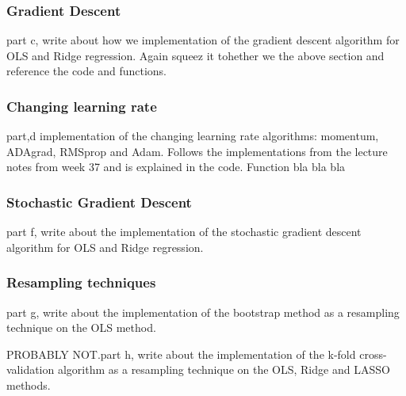 \documentclass[amssymb,twocolumn,aps]{revtex4}
\begin{document}
\subsubsection{Gradient Descent}
part c, write about how we implementation of the gradient descent algorithm for OLS and Ridge regression.
Again squeez it tohether we the above section and reference the code and functions.

\subsubsection*{Changing learning rate}
part,d implementation of the changing learning rate algorithms: momentum, ADAgrad, RMSprop and Adam.
Follows the implementations from the lecture notes from week 37 \cite{compfys} and is explained in the code.
Function  bla bla bla


\subsubsection*{Stochastic Gradient Descent}
part f, write about the implementation of the stochastic gradient descent algorithm for OLS and Ridge regression.

\subsubsection{Resampling techniques}
part g, write about the implementation of the bootstrap method as a resampling technique on the OLS method.

PROBABLY NOT.part h, write about the implementation of the k-fold cross-validation algorithm as a resampling technique on the OLS, Ridge and LASSO methods.

\end{document}
